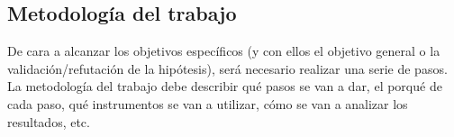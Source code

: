\subsection{Metodología del trabajo}

De cara a alcanzar los objetivos específicos (y con ellos el objetivo general o la validación/refutación de la hipótesis), será necesario realizar una serie de pasos. La metodología del trabajo debe describir qué pasos se van a dar, el porqué de cada paso, qué instrumentos se van a utilizar, cómo se van a analizar los resultados, etc.

\newpage